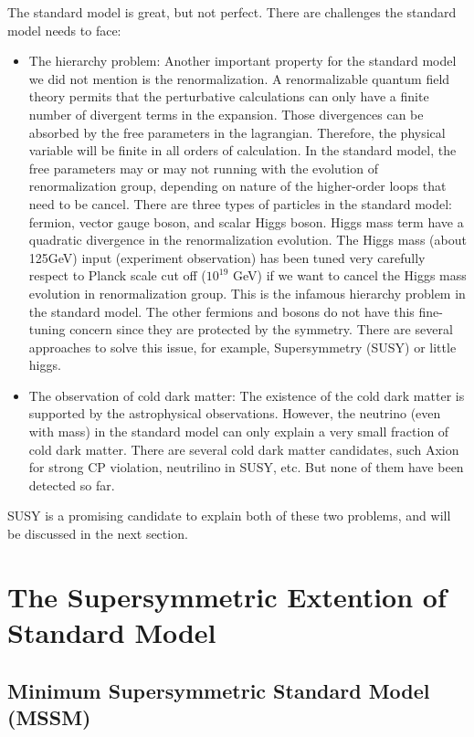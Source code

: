 The standard model is great, but not perfect. There are challenges the standard model needs to face:
\begin{itemize}
\item The hierarchy problem: Another important property for the standard model we did not mention is the renormalization. A renormalizable quantum field theory permits that the perturbative calculations can only have a finite number of divergent terms in the expansion. Those divergences can be absorbed by the free parameters in the lagrangian. Therefore, the physical variable will be finite in all orders of calculation. In the standard model, the free parameters may or may not running with the evolution of renormalization group, depending on nature of the higher-order loops that need to be cancel. There are three types of particles in the standard model: fermion, vector gauge boson, and scalar Higgs boson. Higgs mass term have a quadratic divergence in the renormalization evolution. The Higgs mass (about 125GeV) input (experiment observation) has been tuned very carefully respect to Planck scale cut off ($10^{19}$ GeV) if we want to cancel the Higgs mass evolution in renormalization group. This is the infamous hierarchy problem in the standard model. The other fermions and bosons do not have this fine-tuning concern since they are protected by the symmetry. There are several approaches to solve this issue, for example, Supersymmetry (SUSY) or little higgs\cite{Schmaltz:2005ky}. 
\item The observation of cold dark matter: The existence of the cold dark matter is supported by the astrophysical observations. However, the neutrino (even with mass) in the standard model can only explain a very small fraction of cold dark matter. There are several cold dark matter candidates, such Axion for strong CP violation, neutrilino in SUSY, etc. But none of them have been detected so far.
\end{itemize}

SUSY is a promising candidate to explain both of these two problems, and will be discussed in the next section. 

\clearpage
\section{The Supersymmetric Extention of Standard Model}
\clearpage
\subsection{Minimum Supersymmetric Standard Model (MSSM)}

